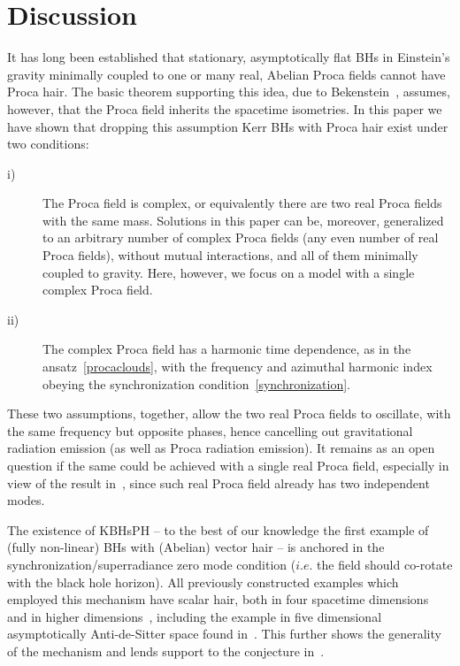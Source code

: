 \documentclass{article}
\numberwithin{equation}{section}
\begin{document}
\section{Discussion}
\label{sec_discussion}
It has long been established that stationary, asymptotically flat BHs in Einstein's gravity minimally coupled to one or many real, Abelian Proca fields cannot have Proca hair. The basic theorem supporting this idea, due to Bekenstein~\cite{Bekenstein:1971hc,Bekenstein:1972ky}, assumes, however, that the Proca field inherits the spacetime isometries. In this paper we have shown that dropping this assumption Kerr BHs with Proca hair exist under two conditions:
\begin{description}
\item[i)] The Proca field is complex, or equivalently there are two real Proca fields with the same mass. Solutions in this paper can be, moreover, generalized to an arbitrary number of complex Proca fields (any even number of real Proca fields), without mutual interactions, and all of them minimally coupled to gravity. Here, however, we focus on a model with a single complex Proca field. 
\item[ii)] The complex Proca field has a harmonic time dependence, as in the ansatz~\eqref{procaclouds}, with the frequency and azimuthal harmonic index obeying the synchronization condition~\eqref{synchronization}.
\end{description}
These two assumptions, together, allow the two real Proca fields to oscillate, with the same frequency but opposite phases, hence cancelling out gravitational radiation emission (as well as Proca radiation emission). It remains as an open question if the same could be achieved with a single real Proca field, especially in view of the result in~\cite{Wang:2015fgp}, since such real Proca field already has two independent modes. 

\bigskip

The existence of  KBHsPH -- to the best of our knowledge the first example of (fully non-linear)   
BHs with (Abelian) vector hair -- is anchored  in the synchronization/superradiance zero mode condition
($i.e.$ the field should co-rotate with the  black hole horizon). 
%
All previously constructed examples which employed this mechanism have scalar hair, 
both in four spacetime dimensions~\cite{Herdeiro:2014goa,Herdeiro:2015gia,Kleihaus:2015iea,Herdeiro:2015tia} and in higher dimensions~\cite{Brihaye:2014nba,Herdeiro:2015kha}, 
including the example in five dimensional asymptotically Anti-de-Sitter space found in~\cite{Dias:2011at}. 
This further shows the generality of the mechanism and lends support to the conjecture in~\cite{Herdeiro:2014goa,Herdeiro:2014ima}.
\end{document}

